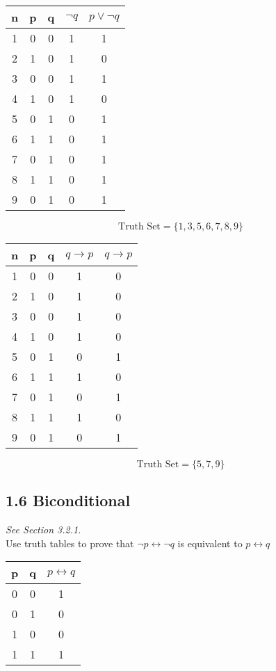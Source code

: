 \documentclass{article}
\begin{document}
\begin{center}
\begin{tabular}{|c|c|c|c|c|}
\hline n & p & q & $\neg q$ & $p \vee \neg q$ \\ 
\hline 1 & 0 & 0 & 1 & 1\\ 
\hline 2 & 1 & 0 & 1 & 0\\ 
\hline 3 & 0 & 0 & 1 & 1\\ 
\hline 4 & 1 & 0 & 1 & 0\\ 
\hline 5 & 0 & 1 & 0 & 1\\ 
\hline 6 & 1 & 1 & 0 & 1\\ 
\hline 7 & 0 & 1 & 0 & 1\\ 
\hline 8 & 1 & 1 & 0 & 1\\ 
\hline 9 & 0 & 1 & 0 & 1\\ 
\hline 
\end{tabular} 
\[\mbox{Truth Set} = \{1,3,5,6,7,8,9\}\]

\begin{tabular}{|c|c|c|c|c|}
\hline n & p & q & $  q \rightarrow p$ & $  q \rightarrow p$ \\ 
\hline 1 & 0 & 0 & 1 & 0\\ 
\hline 2 & 1 & 0 & 1 & 0\\ 
\hline 3 & 0 & 0 & 1 & 0\\ 
\hline 4 & 1 & 0 & 1 & 0\\ 
\hline 5 & 0 & 1 & 0 & 1\\ 
\hline 6 & 1 & 1 & 1 & 0\\ 
\hline 7 & 0 & 1 & 0 & 1\\ 
\hline 8 & 1 & 1 & 1 & 0\\ 
\hline 9 & 0 & 1 & 0 & 1\\ 
\hline 
\end{tabular} 
\[\mbox{Truth Set} = \{5,7,9\}\]
\newpage
\subsection*{1.6 Biconditional}
\emph{See Section 3.2.1}.\\
Use truth tables to prove that $ \neg p \leftrightarrow \neg q $ is equivalent to  $ p \leftrightarrow q $

\begin{tabular}{|c|c|c|}
\hline  p& q & $p \leftrightarrow q$ \\ 
\hline  0& 0 &  1\\ 
\hline  0& 1 &  0\\ 
\hline  1& 0 &  0\\ 
\hline  1& 1 &  1\\ 
\hline 
\end{tabular} 



\end{center}
\end{document}
